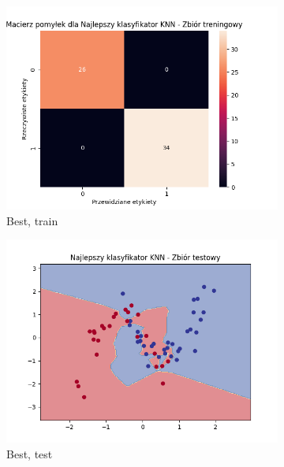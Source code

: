 \documentclass[12pt]{article}
\newcommand*{\subfigwidth}{0.24\textwidth}
\begin{document}
\begin{figure}[H]
\begin{subfigure}[t]{\subfigwidth}
        \includegraphics[width=\linewidth]{img/exp_3/knn/2_3/best/train_matrix.png}
        \caption{Best, train}
    \end{subfigure}
    \hfill
    \begin{subfigure}[t]{\subfigwidth}
        \includegraphics[width=\linewidth]{img/exp_3/knn/2_3/best/test_boundary.png}
        \caption{Best, test}
    \end{subfigure}
    \hfill
    \begin{subfigure}[t]{\subfigwidth}

\end{subfigure}
\end{figure}
\end{document}
